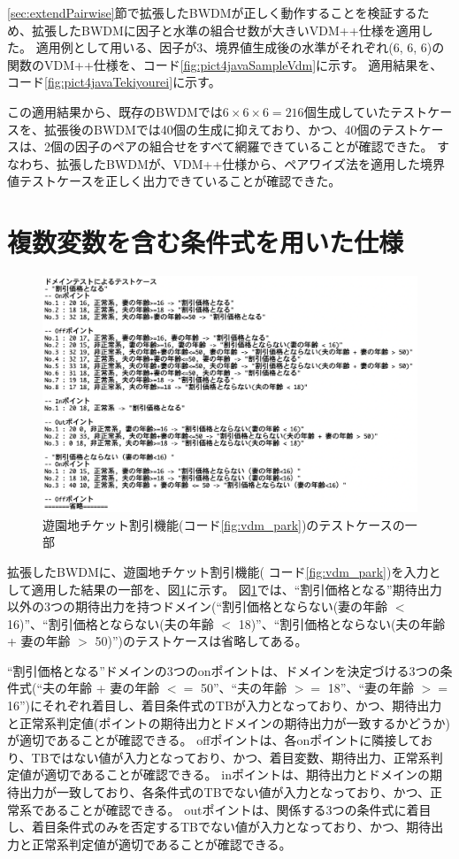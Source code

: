 \documentclass[uplatex, report, a4j, 10pt]{jsbook}
\begin{document}
\ref{sec:extendPairwise}節で拡張したBWDMが正しく動作することを検証するため、拡張したBWDMに因子と水準の組合せ数が大きいVDM++仕様を適用した。
適用例として用いる、因子が3、境界値生成後の水準がそれぞれ(6, 6, 6)の関数のVDM++仕様を、コード\ref{fig:pict4javaSampleVdm}に示す。
適用結果を、コード\ref{fig:pict4javaTekiyourei}に示す。

この適用結果から、既存のBWDMでは$6 \times 6 \times 6 = 216個$生成していたテストケースを、拡張後のBWDMでは40個の生成に抑えており、かつ、40個のテストケースは、2個の因子のペアの組合せをすべて網羅できていることが確認できた。
すなわち、拡張したBWDMが、VDM++仕様から、ペアワイズ法を適用した境界値テストケースを正しく出力できていることが確認できた。


\section{複数変数を含む条件式を用いた仕様}
\begin{figure}[tp]
  \centering
  \includegraphics[keepaspectratio, width=160mm]{figs/tekiyourei}
  \caption{遊園地チケット割引機能(コード\ref{fig:vdm_park})のテストケースの一部}
  \label{fig:park_testcase}
\end{figure}

拡張したBWDMに、遊園地チケット割引機能( コード\ref{fig:vdm_park})を入力として適用した結果の一部を、図\ref{fig:park_testcase}に示す。
図\ref{fig:park_testcase}では、“割引価格となる”期待出力以外の3つの期待出力を持つドメイン(“割引価格とならない(妻の年齢 $<$ 16)”、“割引価格とならない(夫の年齢 $<$ 18)”、“割引価格とならない(夫の年齢 + 妻の年齢 $>$ 50)”)のテストケースは省略してある。

“割引価格となる”ドメインの3つのonポイントは、ドメインを決定づける3つの条件式(“夫の年齢 + 妻の年齢 $<=$ 50”、“夫の年齢 $>=$ 18”、“妻の年齢 $>=$ 16”)にそれぞれ着目し、着目条件式のTBが入力となっており、かつ、期待出力と正常系判定値(ポイントの期待出力とドメインの期待出力が一致するかどうか)が適切であることが確認できる。
offポイントは、各onポイントに隣接しており、TBではない値が入力となっており、かつ、着目変数、期待出力、正常系判定値が適切であることが確認できる。
inポイントは、期待出力とドメインの期待出力が一致しており、各条件式のTBでない値が入力となっており、かつ、正常系であることが確認できる。
outポイントは、関係する3つの条件式に着目し、着目条件式のみを否定するTBでない値が入力となっており、かつ、期待出力と正常系判定値が適切であることが確認できる。
\end{document}
